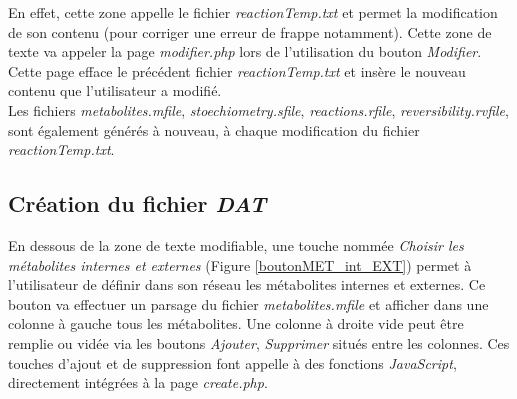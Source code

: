 En effet, cette zone appelle le fichier \emph{reactionTemp.txt} et permet la modification de son contenu (pour corriger une erreur de frappe notamment). Cette zone de texte va appeler la page \emph{modifier.php} lors de l'utilisation du bouton \emph{Modifier}.\\
 Cette page efface le précédent fichier \emph{reactionTemp.txt} et insère le nouveau contenu que l'utilisateur a modifié. \\
 Les fichiers \emph{metabolites.mfile}, \emph{stoechiometry.sfile}, \emph{reactions.rfile}, \emph{reversibility.rvfile}, sont également générés à nouveau, à chaque modification du fichier \emph{reactionTemp.txt}.
 
\subsection{Création du fichier \emph{DAT}}

En dessous de la zone de texte modifiable, une touche nommée \emph{Choisir les métabolites internes et externes} (Figure \ref{boutonMET_int_EXT}) permet à l'utilisateur de définir dans son réseau les métabolites internes et externes. Ce bouton va effectuer un parsage du fichier \emph{metabolites.mfile} et afficher dans une colonne à gauche tous les métabolites. Une colonne à droite vide peut être remplie ou vidée via les boutons \emph{Ajouter}, \emph{Supprimer} situés entre les colonnes.
Ces touches d'ajout et de suppression font appelle à des fonctions \emph{JavaScript}, directement intégrées à la page \emph{create.php}.\\

